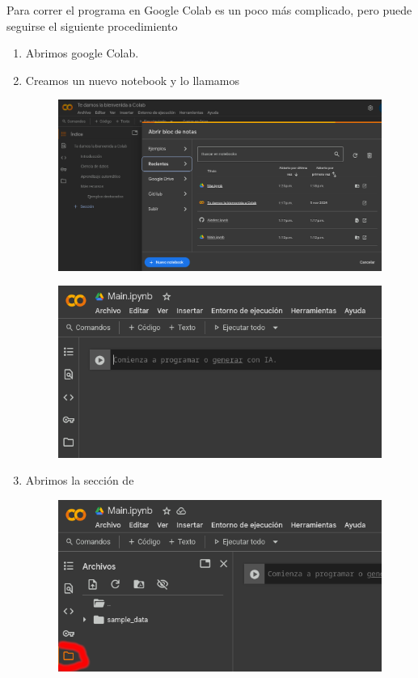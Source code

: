 \documentclass[12pt, Tahoma]{article}
\begin{document}
	Para correr el programa en Google Colab es un poco más complicado, pero puede seguirse el siguiente procedimiento
	\begin{enumerate}
		\item Abrimos google Colab.
		\item Creamos un nuevo notebook y lo llamamos 
			\begin{figure}[H]
				\centering
				\includegraphics[scale=0.3]{correr9.png}
			\end{figure}
			\begin{figure}[H]
				\centering
				\includegraphics[scale=0.6]{correr10.png}
			\end{figure}
		\item Abrimos la sección de 
			\begin{figure}[H]
				\centering
				\includegraphics[scale=2]{correr11.png}

\end{figure}
\end{enumerate}
\end{document}
